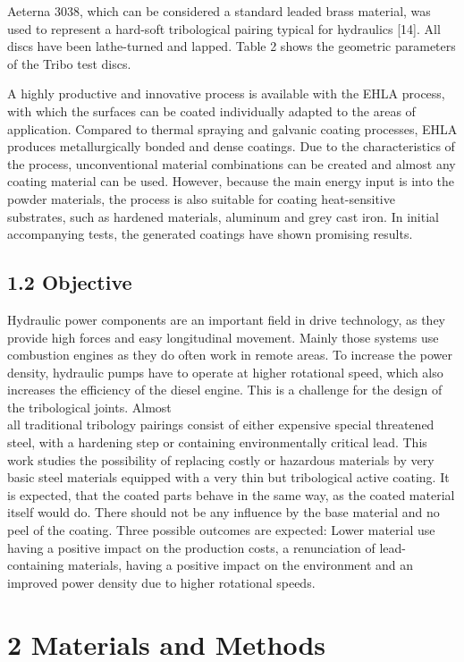 \documentclass[10pt]{article}
\begin{document}
Aeterna 3038, which can be considered a standard leaded brass material, was used to represent a hard-soft tribological pairing typical for hydraulics [14]. All discs have been lathe-turned and lapped. Table 2 shows the geometric parameters of the Tribo test discs.

A highly productive and innovative process is available with the EHLA process, with which the surfaces can be coated individually adapted to the areas of application. Compared to thermal spraying and galvanic coating processes, EHLA produces metallurgically bonded and dense coatings. Due to the characteristics of the process, unconventional material combinations can be created and almost any coating material can be used. However, because the main energy input is into the powder materials, the process is also suitable for coating heat-sensitive substrates, such as hardened materials, aluminum and grey cast iron. In initial accompanying tests, the generated coatings have shown promising results.

\subsection*{1.2 Objective}
Hydraulic power components are an important field in drive technology, as they provide high forces and easy longitudinal movement. Mainly those systems use combustion engines as they do often work in remote areas. To increase the power density, hydraulic pumps have to operate at higher rotational speed, which also increases the efficiency of the diesel engine. This is a challenge for the design of the tribological joints. Almost\\
all traditional tribology pairings consist of either expensive special threatened steel, with a hardening step or containing environmentally critical lead. This work studies the possibility of replacing costly or hazardous materials by very basic steel materials equipped with a very thin but tribological active coating. It is expected, that the coated parts behave in the same way, as the coated material itself would do. There should not be any influence by the base material and no peel of the coating. Three possible outcomes are expected: Lower material use having a positive impact on the production costs, a renunciation of lead-containing materials, having a positive impact on the environment and an improved power density due to higher rotational speeds.

\section*{2 Materials and Methods}
\end{document}
